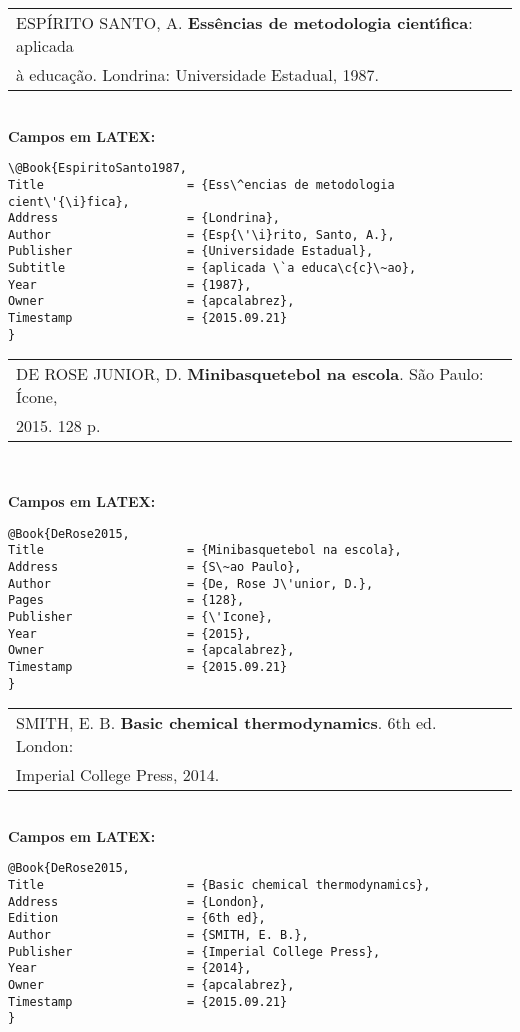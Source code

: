 \begin{tabular}{|l|c|} \hline
 ESP\'IRITO SANTO, A. \textbf{Ess\^encias de metodologia cient\'{\i}fica}: aplicada \\
 \`a educa\c{c}\~ao. Londrina: Universidade Estadual, 1987. \\\hline
\end{tabular}\\

\textbf{Campos em LATEX:}

\begin{verbatim}
\@Book{EspiritoSanto1987,
Title                    = {Ess\^encias de metodologia cient\'{\i}fica},
Address                  = {Londrina},
Author                   = {Esp{\'\i}rito, Santo, A.},
Publisher                = {Universidade Estadual},
Subtitle                 = {aplicada \`a educa\c{c}\~ao},
Year                     = {1987},
Owner                    = {apcalabrez},
Timestamp                = {2015.09.21}
}
\end{verbatim}

\begin{tabular}{|l|c|} \hline
DE ROSE JUNIOR, D. \textbf{Minibasquetebol na escola}. S\~ao Paulo: \'Icone, \\ 2015. 128 p. \\\hline
\end{tabular}\\

\newpage

\textbf{Campos em LATEX:}

\begin{verbatim}
@Book{DeRose2015,
Title                    = {Minibasquetebol na escola},
Address                  = {S\~ao Paulo},
Author                   = {De, Rose J\'unior, D.},
Pages                    = {128},
Publisher                = {\'Icone},
Year                     = {2015},
Owner                    = {apcalabrez},
Timestamp                = {2015.09.21}
}
\end{verbatim}

\begin{tabular}{|l|c|} \hline
	SMITH, E. B. \textbf{Basic chemical thermodynamics}. 6th ed. London:\\ Imperial College Press, 2014.  \\\hline
\end{tabular}\\

\textbf{Campos em LATEX:}

\begin{verbatim}
@Book{DeRose2015,
Title                    = {Basic chemical thermodynamics},
Address                  = {London},
Edition                  = {6th ed},
Author                   = {SMITH, E. B.},
Publisher                = {Imperial College Press},
Year                     = {2014},
Owner                    = {apcalabrez},
Timestamp                = {2015.09.21}
}
\end{verbatim}

